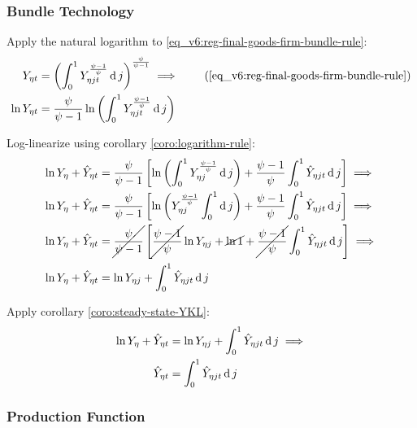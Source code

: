 \documentclass[../thesis.tex]{subfiles}
\begin{document}

	\subsubsection*{Bundle Technology}

Apply the natural logarithm to \ref{eq_v6:reg-final-goods-firm-bundle-rule}:
\begin{align}
	Y_{\eta t} &= \left( \int_{0}^{1} Y_{\eta jt}^{\frac{\psi-1}{\psi}} \dif j \right)^{\frac{\psi}{\psi-1}} \implies  \tag{\ref{eq_v6:reg-final-goods-firm-bundle-rule}} \\
	\ln{Y_{\eta t}} &= {\frac{\psi}{\psi-1}} \ln{\left( \int_{0}^{1} Y_{\eta jt}^{\frac{\psi-1}{\psi}} \dif j \right)} \nonumber
\end{align}

Log-linearize using corollary \ref{coro:logarithm-rule}:
\begin{align}
	\ln{Y_{\eta}} + \hat{Y}_{\eta t} &= \frac{\psi}{\psi-1} \left[ \ln \left( \int_{0}^{1} Y_{\eta j}^{\frac{\psi-1}{\psi}} \operatorname{d} j \right) + \frac{\psi-1}{\psi} \int_{0}^{1} \hat{Y}_{\eta jt} \operatorname{d} j \right] \implies \nonumber
	\\
	\ln{Y_{\eta}} + \hat{Y}_{\eta t} &= \frac{\psi}{\psi-1} \left[ \ln \left( Y_{\eta j}^{\frac{\psi-1}{\psi}} \int_{0}^{1} \operatorname{d} j \right) + \frac{\psi-1}{\psi} \int_{0}^{1} \hat{Y}_{\eta jt} \operatorname{d} j \right] \implies \nonumber
	\\
	\ln{Y_{\eta}} + \hat{Y}_{\eta t} &= \cancel{\frac{\psi}{\psi-1}} \left[ \cancel{\frac{\psi-1}{\psi}} \ln{Y_{\eta j}} + \cancel{\ln1} + \cancel{\frac{\psi-1}{\psi}} \int_{0}^{1} \hat{Y}_{\eta jt} \operatorname{d} j \right] \implies \nonumber
	\\
	\ln{Y_{\eta}} + \hat{Y}_{\eta t} &= \ln{Y_{\eta j}} + \int_{0}^{1} \hat{Y}_{\eta jt} \operatorname{d} j \nonumber
\end{align}

Apply corollary \ref{coro:steady-state-YKL}:
\begin{align}
	\ln{Y_{\eta}} + \hat{Y}_{\eta t} &= \ln{Y_{\eta j}} + \int_{0}^{1} \hat{Y}_{\eta jt} \operatorname{d} j \implies \nonumber \\
	\hat{Y}_{\eta t} &= \int_{0}^{1} \hat{Y}_{\eta jt} \operatorname{d} j 
	\label{eq_v6:reg-ll-final-goods-firm-bundle-rule}
\end{align}


\subsubsection*{Production Function}
\end{document}
